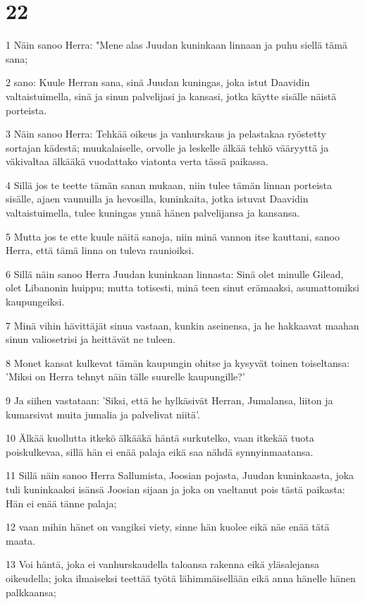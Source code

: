\chapter{22}

\par 1 Näin sanoo Herra: "Mene alas Juudan kuninkaan linnaan ja puhu siellä tämä sana;
\par 2 sano: Kuule Herran sana, sinä Juudan kuningas, joka istut Daavidin valtaistuimella, sinä ja sinun palvelijasi ja kansasi, jotka käytte sisälle näistä porteista.
\par 3 Näin sanoo Herra: Tehkää oikeus ja vanhurskaus ja pelastakaa ryöstetty sortajan kädestä; muukalaiselle, orvolle ja leskelle älkää tehkö vääryyttä ja väkivaltaa älkääkä vuodattako viatonta verta tässä paikassa.
\par 4 Sillä jos te teette tämän sanan mukaan, niin tulee tämän linnan porteista sisälle, ajaen vaunuilla ja hevosilla, kuninkaita, jotka istuvat Daavidin valtaistuimella, tulee kuningas ynnä hänen palvelijansa ja kansansa.
\par 5 Mutta jos te ette kuule näitä sanoja, niin minä vannon itse kauttani, sanoo Herra, että tämä linna on tuleva raunioiksi.
\par 6 Sillä näin sanoo Herra Juudan kuninkaan linnasta: Sinä olet minulle Gilead, olet Libanonin huippu; mutta totisesti, minä teen sinut erämaaksi, asumattomiksi kaupungeiksi.
\par 7 Minä vihin hävittäjät sinua vastaan, kunkin aseinensa, ja he hakkaavat maahan sinun valiosetrisi ja heittävät ne tuleen.
\par 8 Monet kansat kulkevat tämän kaupungin ohitse ja kysyvät toinen toiseltansa: 'Miksi on Herra tehnyt näin tälle suurelle kaupungille?'
\par 9 Ja siihen vastataan: 'Siksi, että he hylkäsivät Herran, Jumalansa, liiton ja kumarsivat muita jumalia ja palvelivat niitä'.
\par 10 Älkää kuollutta itkekö älkääkä häntä surkutelko, vaan itkekää tuota poiskulkevaa, sillä hän ei enää palaja eikä saa nähdä synnyinmaatansa.
\par 11 Sillä näin sanoo Herra Sallumista, Joosian pojasta, Juudan kuninkaasta, joka tuli kuninkaaksi isänsä Joosian sijaan ja joka on vaeltanut pois tästä paikasta: Hän ei enää tänne palaja;
\par 12 vaan mihin hänet on vangiksi viety, sinne hän kuolee eikä näe enää tätä maata.
\par 13 Voi häntä, joka ei vanhurskaudella taloansa rakenna eikä yläsalejansa oikeudella; joka ilmaiseksi teettää työtä lähimmäisellään eikä anna hänelle hänen palkkaansa;
